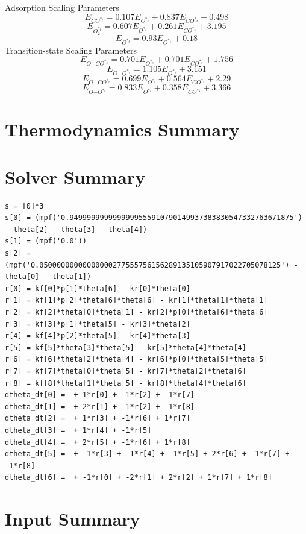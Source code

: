 \documentclass[a4paper,8pt]{report}
\begin{document}
Adsorption Scaling Parameters\\
\begin{equation}
\label{ads_scaling_1}
E_{CO^{*_t}} = 0.107E_{O^{*_s}} + 0.837E_{CO^{*_s}} + 0.498
\end{equation}
\begin{equation}
\label{ads_scaling_2}
E_{O_{2}^{*_t}} = 0.607E_{O^{*_s}} + 0.261E_{CO^{*_s}} + 3.195
\end{equation}
\begin{equation}
\label{ads_scaling_3}
E_{O^{*_t}} = 0.93E_{O^{*_s}} + 0.18
\end{equation}
Transition-state Scaling Parameters\\
\begin{equation}
\label{TS_scaling_1}
E_{O\mathrm{-}CO^{*_s}} = 0.701E_{O^{*_s}} + 0.701E_{CO^{*_s}} + 1.756
\end{equation}
\begin{equation}
\label{TS_scaling_2}
E_{O\mathrm{-}O^{*_s}} = 1.105E_{O^{*_s}} + 3.151
\end{equation}
\begin{equation}
\label{TS_scaling_3}
E_{O\mathrm{-}CO^{*_t}} = 0.699E_{O^{*_s}} + 0.564E_{CO^{*_s}} + 2.29
\end{equation}
\begin{equation}
\label{TS_scaling_4}
E_{O\mathrm{-}O^{*_t}} = 0.833E_{O^{*_s}} + 0.358E_{CO^{*_s}} + 3.366
\end{equation}\section{Thermodynamics Summary}
\section{Solver Summary}
\begin{verbatim}s = [0]*3
s[0] = (mpf('0.9499999999999999555910790149937383830547332763671875') - theta[2] - theta[3] - theta[4])
s[1] = (mpf('0.0'))
s[2] = (mpf('0.05000000000000000277555756156289135105907917022705078125') - theta[0] - theta[1])
r[0] = kf[0]*p[1]*theta[6] - kr[0]*theta[0]
r[1] = kf[1]*p[2]*theta[6]*theta[6] - kr[1]*theta[1]*theta[1]
r[2] = kf[2]*theta[0]*theta[1] - kr[2]*p[0]*theta[6]*theta[6]
r[3] = kf[3]*p[1]*theta[5] - kr[3]*theta[2]
r[4] = kf[4]*p[2]*theta[5] - kr[4]*theta[3]
r[5] = kf[5]*theta[3]*theta[5] - kr[5]*theta[4]*theta[4]
r[6] = kf[6]*theta[2]*theta[4] - kr[6]*p[0]*theta[5]*theta[5]
r[7] = kf[7]*theta[0]*theta[5] - kr[7]*theta[2]*theta[6]
r[8] = kf[8]*theta[1]*theta[5] - kr[8]*theta[4]*theta[6]
dtheta_dt[0] =  + 1*r[0] + -1*r[2] + -1*r[7]
dtheta_dt[1] =  + 2*r[1] + -1*r[2] + -1*r[8]
dtheta_dt[2] =  + 1*r[3] + -1*r[6] + 1*r[7]
dtheta_dt[3] =  + 1*r[4] + -1*r[5]
dtheta_dt[4] =  + 2*r[5] + -1*r[6] + 1*r[8]
dtheta_dt[5] =  + -1*r[3] + -1*r[4] + -1*r[5] + 2*r[6] + -1*r[7] + -1*r[8]
dtheta_dt[6] =  + -1*r[0] + -2*r[1] + 2*r[2] + 1*r[7] + 1*r[8]
\end{verbatim}\section{Input Summary}
\end{document}
